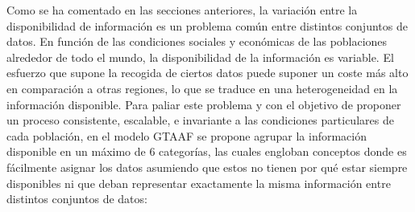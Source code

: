 


Como se ha comentado en las secciones anteriores, la variación entre la disponibilidad de información es un problema común entre distintos conjuntos de datos. En función de las condiciones sociales y económicas de las poblaciones alrededor de todo el mundo, la disponibilidad de la información es variable. El esfuerzo que supone la recogida de ciertos datos puede suponer un coste más alto en comparación a otras regiones, lo que se traduce en una heterogeneidad en la información disponible. Para paliar este problema y con el objetivo de proponer un proceso consistente, escalable, e invariante a las condiciones particulares de cada población, en el modelo GTAAF se propone agrupar la información disponible en un máximo de 6 categorías, las cuales engloban conceptos donde es fácilmente asignar los datos asumiendo que estos no tienen por qué estar siempre disponibles ni que deban representar exactamente la misma información entre distintos conjuntos de datos:

